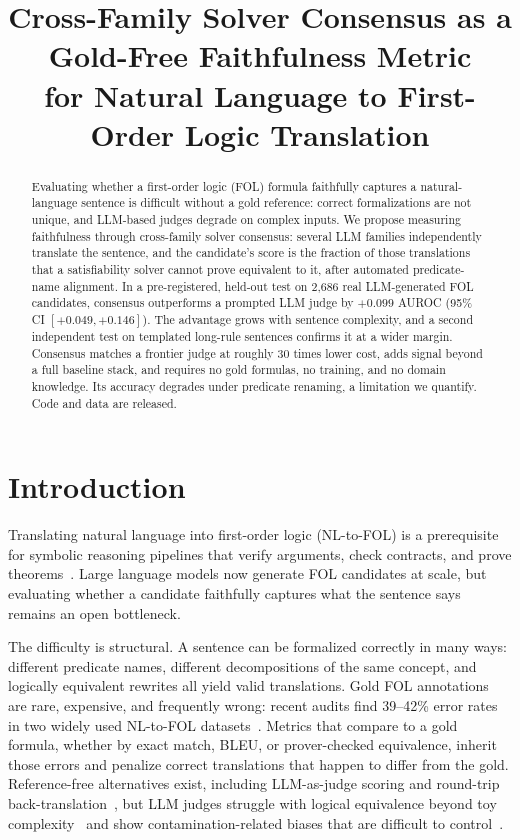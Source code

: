 \documentclass[11pt,letterpaper]{article}
\title{Cross-Family Solver Consensus as a Gold-Free Faithfulness Metric\\for Natural Language to First-Order Logic Translation}
\author{}
\date{}
\begin{document}
\maketitle

\begin{abstract}
Evaluating whether a first-order logic (FOL) formula faithfully captures a natural-language sentence is difficult without a gold reference: correct formalizations are not unique, and LLM-based judges degrade on complex inputs. We propose measuring faithfulness through cross-family solver consensus: several LLM families independently translate the sentence, and the candidate's score is the fraction of those translations that a satisfiability solver cannot prove equivalent to it, after automated predicate-name alignment. In a pre-registered, held-out test on 2,686 real LLM-generated FOL candidates, consensus outperforms a prompted LLM judge by $+0.099$ AUROC (95\% CI $[+0.049, +0.146]$). The advantage grows with sentence complexity, and a second independent test on templated long-rule sentences confirms it at a wider margin. Consensus matches a frontier judge at roughly 30 times lower cost, adds signal beyond a full baseline stack, and requires no gold formulas, no training, and no domain knowledge. Its accuracy degrades under predicate renaming, a limitation we quantify. Code and data are released.
\end{abstract}

\section{Introduction}

Translating natural language into first-order logic (NL-to-FOL) is a prerequisite for symbolic reasoning pipelines that verify arguments, check contracts, and prove theorems~\citep{Pan2023, Ryu2024, Singh2026}. Large language models now generate FOL candidates at scale, but evaluating whether a candidate faithfully captures what the sentence says remains an open bottleneck.

The difficulty is structural. A sentence can be formalized correctly in many ways: different predicate names, different decompositions of the same concept, and logically equivalent rewrites all yield valid translations. Gold FOL annotations are rare, expensive, and frequently wrong: recent audits find 39--42\% error rates in two widely used NL-to-FOL datasets~\citep{Brunello2026}. Metrics that compare to a gold formula, whether by exact match, BLEU, or prover-checked equivalence, inherit those errors and penalize correct translations that happen to differ from the gold. Reference-free alternatives exist, including LLM-as-judge scoring and round-trip back-translation~\citep{Amrollahi2026, Xu2026, Zhang2026}, but LLM judges struggle with logical equivalence beyond toy complexity~\citep{Karia2024} and show contamination-related biases that are difficult to control~\citep{Brunello2025}.
\end{document}
